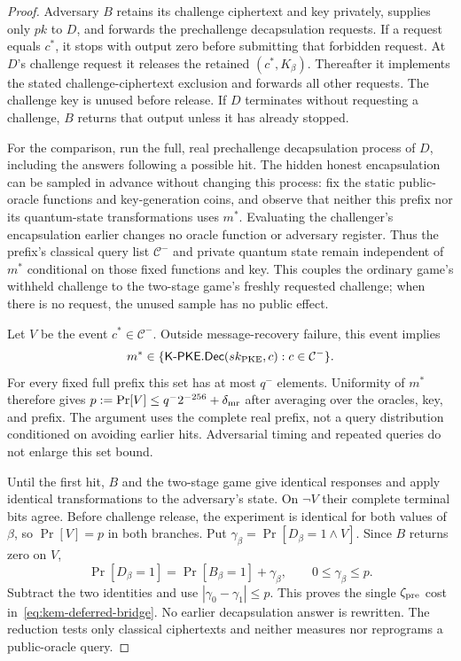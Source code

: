 \documentclass[pdflatex]{sn-jnl}
\theoremstyle{thmstyleone}
\theoremstyle{thmstylethree}
\theoremstyle{thmstyletwo}
\begin{document}
\begin{proof}
Adversary $B$ retains its challenge ciphertext and key privately, supplies
only $pk$ to $D$, and forwards the prechallenge decapsulation requests.
If a request equals $c^*$, it stops with output zero before submitting
that forbidden request. At $D$'s challenge request it releases the retained
$(c^*,K_\beta)$. Thereafter it implements the stated challenge-ciphertext
exclusion and forwards all other requests. The challenge key is unused
before release. If $D$ terminates without requesting a challenge, $B$
returns that output unless it has already stopped.

For the comparison, run the full, real prechallenge decapsulation process
of $D$, including the answers following a possible hit. The hidden honest
encapsulation can be sampled in advance without changing this process:
fix the static public-oracle functions and key-generation coins, and
observe that neither this prefix nor its quantum-state transformations
uses $m^*$. Evaluating the challenger's encapsulation earlier changes no
oracle function or adversary register. Thus the prefix's classical query
list $\mathcal C^-$ and private quantum state remain independent of
$m^*$ conditional on those fixed functions and key. This couples the
ordinary game's withheld challenge to the two-stage game's freshly
requested challenge; when there is no request, the unused sample has no
public effect.

Let $V$ be the event $c^*\in\mathcal C^-$. Outside message-recovery
failure, this event implies
\[
 m^*\in
 \{\mathsf{K\mbox{-}PKE.Dec}(sk_{\rm PKE},c):
                                      c\in\mathcal C^-\}.
\]
For every fixed full prefix this set has at most $q^-$ elements. Uniformity
of $m^*$ therefore gives
$p:=\Pr[V]\le q^-2^{-256}+\delta_{\rm mr}$ after averaging over the
oracles, key, and prefix. The argument uses the complete real prefix,
not a query distribution conditioned on avoiding earlier hits.
Adversarial timing and repeated queries do not enlarge this set bound.

Until the first hit, $B$ and the two-stage game give identical responses
and apply identical transformations to the adversary's state. On
$\neg V$ their complete terminal bits agree. Before challenge release,
the experiment is identical for both values of $\beta$, so $\Pr[V]=p$ in
both branches. Put
$\gamma_\beta=\Pr[D_\beta=1\land V]$. Since $B$ returns zero on $V$,
\[
 \Pr[D_\beta=1]=\Pr[B_\beta=1]+\gamma_\beta,
 \qquad 0\le\gamma_\beta\le p.
\]
Subtract the two identities and use
$|\gamma_0-\gamma_1|\le p$. This proves the single
$\zeta_{\rm pre}$ cost in~\eqref{eq:kem-deferred-bridge}.
No earlier decapsulation answer is rewritten. The reduction tests only
classical ciphertexts and neither measures nor reprograms a public-oracle
query.
\end{proof}
\end{document}

